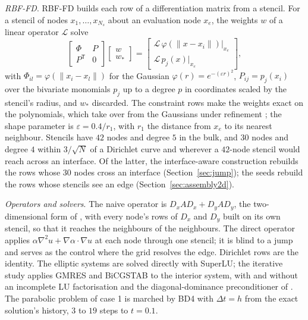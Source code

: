 \documentclass[11pt]{amsart}
\theoremstyle{definition}
\theoremstyle{remark}
\newcommand{\para}[1]{\par\smallskip\noindent\textit{#1}.\enspace}
\begin{document}
\para{RBF-FD}
RBF-FD \cite{FornbergFlyer2015primer,FornbergFlyer2015acta} builds each row
of a differentiation matrix from a stencil. For a stencil of nodes
$x_1, \ldots, x_{N_s}$ about an evaluation node $x_e$, the weights $w$ of a
linear operator $\mathcal{L}$ solve
\begin{equation}
  \label{eq:rbffd}
  \begin{bmatrix} \Phi & P \\ P^{\mathsf T} & 0 \end{bmatrix}
  \begin{bmatrix} w \\ w_* \end{bmatrix}
  =
  \begin{bmatrix}
    \mathcal{L}\, \varphi(\|x - x_i\|) \big|_{x_e} \\
    \mathcal{L}\, p_j(x) \big|_{x_e}
  \end{bmatrix},
\end{equation}
with $\Phi_{il} = \varphi(\|x_i - x_l\|)$ for the Gaussian
$\varphi(r) = e^{-(\varepsilon r)^2}$, $P_{ij} = p_j(x_i)$ over the
bivariate monomials $p_j$ up to a degree $p$ in coordinates scaled by the
stencil's radius, and $w_*$ discarded. The constraint rows make the weights
exact on the polynomials, which take over from the Gaussians under
refinement \cite{FlyerFornbergBayonaBarnett2016,BayonaFlyerFornbergBarnett2017};
the shape parameter is $\varepsilon = 0.4 / r_1$, with $r_1$ the distance
from $x_e$ to its nearest neighbour. Stencils have $42$ nodes and degree $5$ in
the bulk, and $30$ nodes and degree $4$ within $3 / \sqrt N$ of a Dirichlet
curve and wherever a $42$-node stencil would reach across an interface.
Of the latter, the interface-aware construction rebuilds the rows whose
$30$ nodes cross an interface (Section~\ref{sec:jump}); the seeds rebuild
the rows whose stencils see an edge (Section~\ref{sec:assembly2d}).

\para{Operators and solvers}
The naive operator is $D_x A D_x + D_y A D_y$, the two-dimensional form of
\cite[eq.~(76)]{Martin2016}, with every node's rows of $D_x$ and $D_y$ built
on its own stencil, so that it reaches the neighbours of the neighbours.
The direct operator applies $\alpha \nabla^2 u + \nabla \alpha \cdot \nabla
u$ at each node through one stencil; it is blind to a jump and serves as
the control where the grid resolves the edge. Dirichlet rows are the
identity. The elliptic systems are solved directly with SuperLU; the
iterative study applies GMRES and BiCGSTAB to the interior system, with and
without an incomplete LU factorisation and the diagonal-dominance
preconditioner of \cite[App.~B]{Martin2016}. The parabolic problem of
case 1 is marched by BD4 with $\Delta t = h$ from the exact solution's
history, $3$ to $19$ steps to $t = 0.1$.
\end{document}
